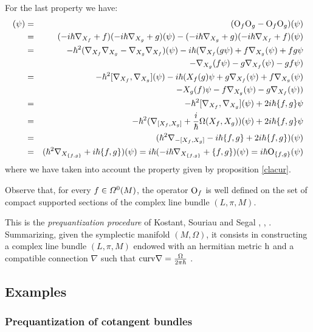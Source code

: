 \documentclass[12pt]{article}
\def\beann{\begin{eqnarray*}}
\def\eeann{\end{eqnarray*}}
\def\dst{\(}
\def\qed{\ifvmode\removelastskip\fi
{\unskip\nobreak\hfil\penalty50\hbox{}\nobreak\hfil
\hbox{\vrule height1.2ex width1.2ex}\parfillskip=0pt
\finalhyphendemerits=0 \par\smallskip}}
\def\Op{{\rm O}}
\def\h{{\rm h}}
\begin{document}
For the last property we have:
\beann
[\Op_f,\Op_g](\psi )
&=&
(\Op_f\Op_g - \Op_f\Op_g)(\psi )
\\
&=&
(-i\hbar \nabla_{X_f} + f)(-i\hbar\nabla_{X_g}+g)(\psi )
- (-i\hbar \nabla_{X_g} + g)(-i\hbar\nabla_{X_f}+f)(\psi )
\\ &=&
-\hbar^2 (\nabla_{X_f}\nabla_{X_g} - \nabla_{X_g}\nabla_{X_f})(\psi )
-i\hbar (\nabla_{X_f}(g\psi ) + f\nabla_{X_g}(\psi ) + fg\psi
\\ & &
- \nabla_{X_g}(f\psi ) - g\nabla_{X_f}(\psi ) -gf\psi )
\\ &=&
-\hbar^2 [\nabla_{X_f},\nabla_{X_g}](\psi )
-i\hbar (X_f(g)\psi + g\nabla_{X_f}(\psi ) + f\nabla_{X_g}(\psi )
\\ & &
- X_g(f)\psi - f\nabla_{X_g}(\psi ) - g\nabla_{X_f}(\psi ))
\\ &=&
-\hbar^2 [\nabla_{X_f},\nabla_{X_g}](\psi ) + 2i\hbar \{ f,g \}\psi
\\ &=&
 -\hbar^2 (\nabla_{[X_f,X_g]} +
 \frac{i}{\hbar}\Omega (X_f,X_g))(\psi ) +2i\hbar \{ f,g \}\psi
\\ &=&
(\hbar^2 \nabla_{-[X_f,X_g]} - i\hbar \{ f,g \} + 2i\hbar \{ f,g \}
)(\psi)
\\ &=&
(\hbar^2 \nabla_{X_{\{ f,g\} }} + i\hbar \{ f,g \} )(\psi) =
i\hbar(-i\hbar \nabla_{X_{\{ f,g\} }} + \{ f,g \} )(\psi) =
i\hbar\Op_{\{ f,g \}}(\psi )
\eeann
where we have taken into account the property given by proposition
\ref{clacur}.
\qed

Observe that, for every $f\in {\mit\Omega}^0(M)$,
the operator $\Op_f$ is well defined on the set
of compact supported sections of the complex line bundle
$(L,\pi , M)$.

This is the
{\it prequantization procedure} of Kostant, Souriau and Segal
\cite{Ko-70}, \cite{Se-60}, \cite{So-69}.
Summarizing, given the symplectic manifold
$(M,\Omega )$, it consists in constructing
a complex line bundle $(L,\pi ,M)$
endowed with an hermitian metric $\h$
and a compatible connection $\nabla$
such that \dst{\rm curv}\nabla = \frac{\Omega}{2\pi \hbar}\) .



\subsection{Examples}


\subsubsection{Prequantization of cotangent bundles}
\end{document}
